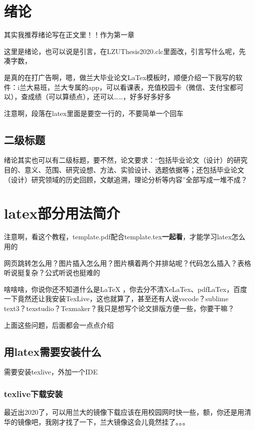 \documentclass[AutoFakeBold]{LZUThesis2007}
\begin{document}
\tableofcontents
\thispagestyle{empty}


\mainmatter

\chapter{绪论}

其实我推荐绪论写在正文里！！作为第一章

    这里是绪论，也可以说是引言，在LZUThesis2020.clc里面改，引言写什么呢，先凑字数，

    是真的在打广告啊，嗯，做兰大毕业论文LaTex模板时，顺便介绍一下我写的软件：i兰大易班，兰大专属的app，可以看课表，充值校园卡（微信、支付宝都可以），查成绩（可以算绩点），还可以……，好多好多好多

    注意啊，段落在latex里面是要空一行的，不要简单一个回车

    \section{二级标题}
    绪论其实也可以有二级标题，要不然，论文要求：“包括毕业论文（设计）的研究目的、意义、范围、研究设想、方法、实验设计、选题依据等；还包括毕业论文（设计）研究领域的历史回顾，文献追溯，理论分析等内容”全部写成一堆不成？



\chapter{latex部分用法简介}

注意啊，看这个教程，template.pdf配合template.tex\textbf{一起看}，才能学习latex怎么用的

网页跳转怎么用？图片插入怎么用？图片横着两个并排站呢？代码怎么插入？表格听说挺复杂？公式听说也挺难的

啥啥啥，你说你还不知道什么是LaTeX ，你去分不清XeLaTex、pdfLaTex，百度一下竟然还让我安装TexLive，这也就算了，甚至还有人说vscode？sublime text3？texstudio？Texmaker？我只是想写个论文排版方便一些，你要干嘛？

上面这些问题，后面都会一点点介绍

\section{用latex需要安装什么}
需要安装texlive，外加一个IDE

\subsection{texlive下载安装}
最近出2020了，可以用兰大的镜像下载应该在用校园网时快一些，额，你还是用清华的镜像吧，我刚才找了一下，兰大镜像这会儿竟然挂了。。。
\end{document}

